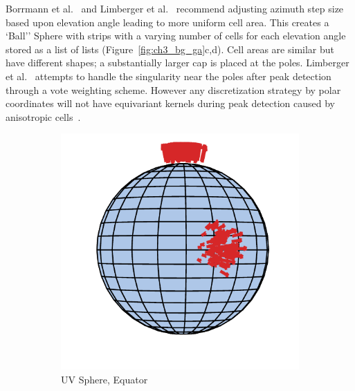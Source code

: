 Borrmann et al.~\cite{borrmann_3d_2011} and Limberger et al.~\cite{limberger_real-time_2015} recommend adjusting azimuth step size based upon elevation angle leading to more uniform cell area.  This creates a `Ball'' Sphere with strips with a varying number of cells for each elevation angle stored as a list of lists (Figure~\ref{fig:ch3_bg_ga}c,d). Cell areas are similar but have different shapes; a substantially larger cap is placed at the poles. Limberger et al.~\cite{limberger_real-time_2015} attempts to handle the singularity near the poles after peak detection through a vote weighting scheme. However any discretization strategy by polar coordinates will not have equivariant kernels during peak detection caused by anisotropic cells~\cite{cohen_gauge_2019}. 
\vspace{-6pt}
\begin{figure}[H]
\centering
  \begin{subfigure}[t]{.23\linewidth}
    \centering\includegraphics[width=.95\linewidth]{chapter_3_polylidar3d/imgs/ref_ga/uv_sphere_1.pdf}
    \caption{UV Sphere, Equator\label{fig:ch3_bg_ga_a}}
  \end{subfigure}
  \begin{subfigure}[t]{.23\linewidth}

\end{subfigure}
\end{figure}
